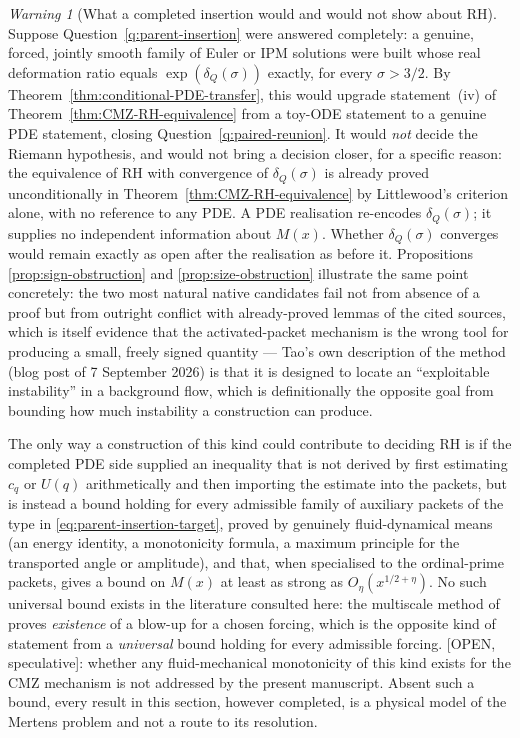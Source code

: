 \documentclass[11pt]{amsart}
\numberwithin{equation}{section}
\theoremstyle{plain}
\theoremstyle{definition}
\theoremstyle{remark}
\newtheorem{warning}[theorem]{Warning}
\begin{document}
\begin{warning}[What a completed insertion would and would not show about RH]
\label{warn:no-progress-without-independent-bound}
Suppose Question~\ref{q:parent-insertion} were answered completely: a
genuine, forced, jointly smooth family of Euler or IPM solutions were built
whose real deformation ratio equals $\exp(\delta_Q(\sigma))$ exactly, for
every $\sigma>3/2$.  By Theorem~\ref{thm:conditional-PDE-transfer}, this
would upgrade statement~(iv) of Theorem~\ref{thm:CMZ-RH-equivalence} from a
toy-ODE statement to a genuine PDE statement, closing
Question~\ref{q:paired-reunion}.  It would \emph{not} decide the Riemann
hypothesis, and would not bring a decision closer, for a specific reason:
the equivalence of RH with convergence of $\delta_Q(\sigma)$ is already
proved unconditionally in Theorem~\ref{thm:CMZ-RH-equivalence} by
Littlewood's criterion alone, with no reference to any PDE.  A PDE
realisation re-encodes $\delta_Q(\sigma)$; it supplies no independent
information about $M(x)$.  Whether $\delta_Q(\sigma)$ converges would remain
exactly as open after the realisation as before it.  Propositions
\ref{prop:sign-obstruction} and \ref{prop:size-obstruction} illustrate the
same point concretely: the two most natural native candidates fail not from
absence of a proof but from outright conflict with already-proved lemmas of
the cited sources, which is itself evidence that the activated-packet
mechanism is the wrong tool for producing a small, freely signed quantity ---
Tao's own description of the method (blog post of 7 September 2026) is that
it is designed to locate an ``exploitable instability'' in a background
flow, which is definitionally the opposite goal from bounding how much
instability a construction can produce.

The only way a construction of this kind could contribute to deciding RH is
if the completed PDE side supplied an inequality that is not derived by
first estimating $c_q$ or $U(q)$ arithmetically and then importing the
estimate into the packets, but is instead a bound holding for every
admissible family of auxiliary packets of the type in
\eqref{eq:parent-insertion-target}, proved by genuinely fluid-dynamical
means (an energy identity, a monotonicity formula, a maximum principle for
the transported angle or amplitude), and that, when specialised to the
ordinal-prime packets, gives a bound on $M(x)$ at least as strong as
$O_\eta(x^{1/2+\eta})$.  No such universal bound exists in the literature
consulted here: the multiscale method of
\cite{CordobaMartinezZoroa2023,CordobaMartinezZoroaZheng2023,AlpogeBuckmasterCoiculescu2026,AlpogeBuckmaster2026}
proves \emph{existence} of a blow-up for a chosen forcing, which is the
opposite kind of statement from a \emph{universal} bound holding for every
admissible forcing.  \textup{[OPEN, speculative]}: whether any
fluid-mechanical monotonicity of this kind exists for the CMZ mechanism is
not addressed by the present manuscript.  Absent such a bound, every result
in this section, however completed, is a physical model of the Mertens
problem and not a route to its resolution.
\end{warning}
\end{document}
